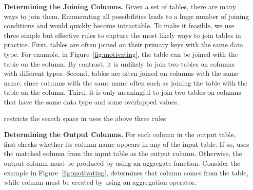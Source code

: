 \vspace{1mm}
{\textbf{Determining the Joining Columns. }} Given a set of tables,
there are many ways to join them. Enumerating all possibilities
leads to a huge number of joining conditions and would quickly
become intractable. To make it feasible, we use
three simple but effective rules to capture
the most likely ways to join tables in practice.
First, tables are often joined on their primary keys with
the same data type. For example, in Figure~\ref{fig:motivating},
the  table can be joined with the 
table on the  column.
By contrast, it is unlikely to join two tables on columns
with different types. Second, tables are often joined
on columns with the same name, since columns with the same name
often such as joining the  table
with the  table on the
 column. Third, it is only meaningful
to join two tables on columns that have the same data type and some
overlapped values. 

\ourtool restricts the search space in uses the above three rules 


{\textbf{Determining the Output Columns.}} For each
column in the output table, \ourtool first checks whether
its column name appears in any of the input table.
If so, \ourtool uses the matched column from the input
table as the output column.
Otherwise, the output column
must be produced by using an aggregate function.
Consider the example in Figure~\ref{fig:motivating},
\ourtool determines that column {} comes from the 
table, while column {} must be created by using an aggregation operator.

